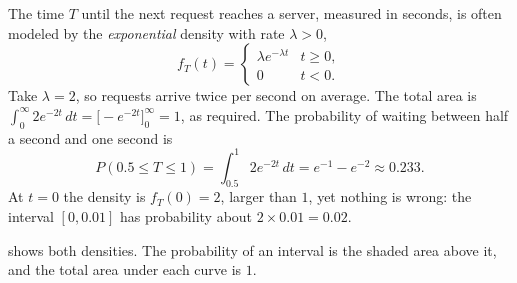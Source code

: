 \begin{example}
  \label{ex:ch05-exponential}
  The time $T$ until the next request reaches a server, measured in
  seconds, is often modeled by the \emph{exponential} density with rate
  $\lambda > 0$,
  \[
    f_T(t) =
    \begin{cases}
      \lambda e^{-\lambda t} & t \ge 0, \\
      0 & t < 0 .
    \end{cases}
  \]
  Take $\lambda = 2$, so requests arrive twice per second on average.
  The total area is $\int_0^\infty 2e^{-2t}\,dt = \bigl[-e^{-2t}
  \bigr]_0^\infty = 1$, as required. The probability of waiting between
  half a second and one second is
  \[
    P(0.5 \le T \le 1) = \int_{0.5}^{1} 2e^{-2t}\, dt
    = e^{-1} - e^{-2} \approx 0.233 .
  \]
  At $t = 0$ the density is $f_T(0) = 2$, larger than $1$, yet nothing
  is wrong: the interval $[0, 0.01]$ has probability about $2 \times 0.01
  = 0.02$.
\end{example}

 shows both densities. The probability of an
interval is the shaded area above it, and the total area under each
curve is $1$.

